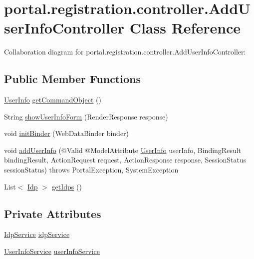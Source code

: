 \hypertarget{classportal_1_1registration_1_1controller_1_1AddUserInfoController}{
\section{portal.registration.controller.AddUserInfoController Class Reference}
\label{classportal_1_1registration_1_1controller_1_1AddUserInfoController}
}


Collaboration diagram for portal.registration.controller.AddUserInfoController:
\subsection*{Public Member Functions}
\begin{DoxyCompactItemize}
\item 
\hyperlink{classportal_1_1registration_1_1domain_1_1UserInfo}{UserInfo} \hyperlink{classportal_1_1registration_1_1controller_1_1AddUserInfoController_abcb27dd8d2bd04640df8db01d5325dc9}{getCommandObject} ()
\item 
String \hyperlink{classportal_1_1registration_1_1controller_1_1AddUserInfoController_a1f6461d624bb25d839f173e912c6a9f0}{showUserInfoForm} (RenderResponse response)
\item 
void \hyperlink{classportal_1_1registration_1_1controller_1_1AddUserInfoController_a925c7078048b00218ff13515a24c3891}{initBinder} (WebDataBinder binder)
\item 
void \hyperlink{classportal_1_1registration_1_1controller_1_1AddUserInfoController_a2750658abc595b838f458b87464e51fe}{addUserInfo} (@Valid @ModelAttribute \hyperlink{classportal_1_1registration_1_1domain_1_1UserInfo}{UserInfo} userInfo, BindingResult bindingResult, ActionRequest request, ActionResponse response, SessionStatus sessionStatus)  throws PortalException, SystemException 
\item 
List$<$ \hyperlink{classportal_1_1registration_1_1domain_1_1Idp}{Idp} $>$ \hyperlink{classportal_1_1registration_1_1controller_1_1AddUserInfoController_a75d0eda43cc0f5e93d292744d81b9e6e}{getIdps} ()
\end{DoxyCompactItemize}
\subsection*{Private Attributes}
\begin{DoxyCompactItemize}
\item 
\hyperlink{interfaceportal_1_1registration_1_1services_1_1IdpService}{IdpService} \hyperlink{classportal_1_1registration_1_1controller_1_1AddUserInfoController_a3c5be3236bf7b6003fea1c2ca64ef350}{idpService}
\item 
\hyperlink{interfaceportal_1_1registration_1_1services_1_1UserInfoService}{UserInfoService} \hyperlink{classportal_1_1registration_1_1controller_1_1AddUserInfoController_a1a21bbb7663d92f2485157535a250956}{userInfoService}
\end{DoxyCompactItemize}
